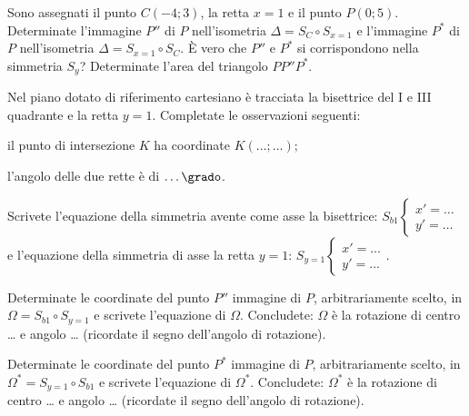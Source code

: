 % 
% 

\begin{esercizio}
  \label{ese:8.65} %
  Sono assegnati il punto \(C(-4;3)\), la retta \(x=1\) e il punto 
  \(P(0;5)\). Determinate l'immagine \(P''\) di \(P\) nell'isometria 
  \(\Delta=S_{C}\circ S_{x=1}\) e l'immagine \(P^*\) di \(P\) nell'isometria 
  \(\Delta=S_{x=1}\circ S_{C}\). \`E vero che \(P''\) e \(P^*\) si 
  corrispondono nella simmetria \(S_y\)? Determinate l'area del triangolo 
  \(PP''P^*\).
\end{esercizio}

\begin{esercizio}
  \label{ese:8.69} %
  Nel piano dotato di riferimento cartesiano è tracciata la bisettrice 
  del I e III quadrante e la 
  retta \(y=1\). Completate le osservazioni seguenti:
  \begin{enumeratea}
    \item il punto di intersezione \(K\) ha coordinate 
    \(K(\ldots{};\ldots{})\);
    \item l'angolo delle due rette è di \(\ldots{}\grado\).
  \end{enumeratea}
  Scrivete l'equazione della simmetria avente come asse la bisettrice: 
  \(S_{b1}\begin{cases}x'=\ldots{}\\y'=\ldots{}\end{cases}\) e 
  l'equazione della simmetria di asse la retta \(y=1\): 
  \(S_{y=1}\begin{cases}x'=\ldots{}\\y'=\ldots{}\end{cases}\).

  Determinate le coordinate del punto \(P''\) immagine di \(P\), 
  arbitrariamente scelto, in \(\Omega = S_{b1} \circ S_{y=1}\) e scrivete 
  l'equazione di \(\Omega\).
  Concludete: \(\Omega\) è la rotazione di centro \ldots{} e angolo 
  \ldots{} (ricordate il segno dell'angolo di rotazione).

  Determinate le coordinate del punto \(P^*\) immagine di \(P\), 
  arbitrariamente scelto, in \(\Omega^*=S_{y=1} \circ S_{b1}\) e scrivete 
  l'equazione di \(\Omega^*\).
  Concludete: \(\Omega^*\) è la rotazione di centro \ldots{} e angolo 
  \ldots{} (ricordate il segno dell'angolo di rotazione).
\end{esercizio}


